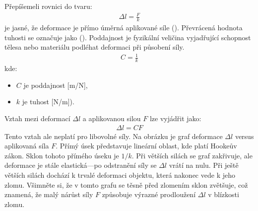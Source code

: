 \documentclass[letterpaper,10pt,english]{jupyterBook}
\begin{document}
\sphinxAtStartPar
Přepíšeme\sphinxhyphen{}li rovnici do tvaru:
\begin{equation*}
\begin{split}
\Delta l = \frac{F}{k}
\end{split}
\end{equation*}
\sphinxAtStartPar
je jasné, že deformace je přímo úměrná aplikované síle (). Převrácená hodnota tuhosti se označuje jako  (). Poddajnost je fyzikální veličina vyjadřující schopnost tělesa nebo materiálu podléhat deformaci při působení síly.
\begin{equation*}
\begin{split}
C = \frac{1}{k}
\end{split}
\end{equation*}
\sphinxAtStartPar
kde:
\begin{itemize}
\item {} 
\sphinxAtStartPar
\(C\) je poddajnost {[}m/N{]},

\item {} 
\sphinxAtStartPar
\(k\) je tuhost {[}N/m{]}).

\end{itemize}

\sphinxAtStartPar
Vztah mezi deformací \(\Delta l\) a aplikovanou silou  \(F\) lze vyjádřit jako:
\begin{equation*}
\begin{split}
\Delta l = C F
\end{split}
\end{equation*}
\sphinxAtStartPar
Tento vztah ale neplatí pro libovolné síly.  Na obrázku je graf deformace \(\Delta l\) versus aplikovaná síla \(F\). Přímý úsek představuje lineární oblast, kde platí Hookeův zákon. Sklon tohoto přímého úseku je \(1/k\). Při větších silách se graf zakřivuje, ale deformace je stále elastická—po odstranění síly se \(\Delta l\) vrátí na nulu. Při ještě větších silách dochází k trvalé deformaci objektu, která nakonec vede k jeho zlomu. Všimněte si, že v tomto grafu se těsně před zlomením sklon zvětšuje, což znamená, že malý nárůst síly \(F\) způsobuje výrazné prodloužení \(\Delta l\) v blízkosti zlomu.

\noindent{}
\end{document}
